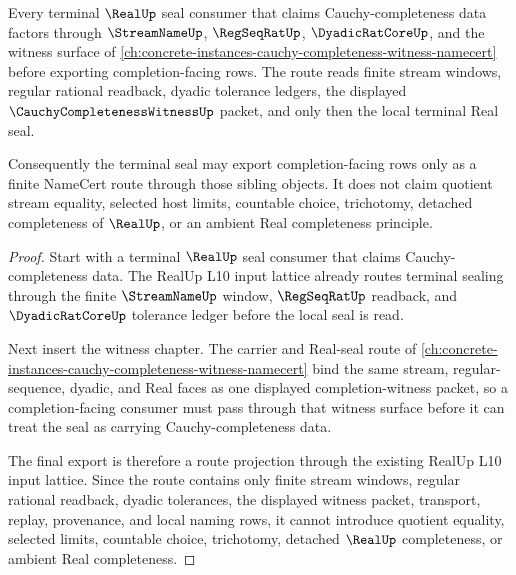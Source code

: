 \begin{theorem}
\label{thm:real-terminal-seal-cauchy-completeness-witness}
Every terminal $\RealUp$ seal consumer that claims Cauchy-completeness data factors through $\StreamNameUp$, $\RegSeqRatUp$, $\DyadicRatCoreUp$, and the witness surface of \autoref{ch:concrete-instances-cauchy-completeness-witness-namecert} before exporting completion-facing rows. The route reads finite stream windows, regular rational readback, dyadic tolerance ledgers, the displayed $\CauchyCompletenessWitnessUp$ packet, and only then the local terminal Real seal.

Consequently the terminal seal may export completion-facing rows only as a finite NameCert route through those sibling objects. It does not claim quotient stream equality, selected host limits, countable choice, trichotomy, detached completeness of $\RealUp$, or an ambient Real completeness principle.
\end{theorem}
\begin{proof}
Start with a terminal $\RealUp$ seal consumer that claims Cauchy-completeness data. The RealUp L10 input lattice already routes terminal sealing through the finite $\StreamNameUp$ window, $\RegSeqRatUp$ readback, and $\DyadicRatCoreUp$ tolerance ledger before the local seal is read.

Next insert the witness chapter. The carrier and Real-seal route of \autoref{ch:concrete-instances-cauchy-completeness-witness-namecert} bind the same stream, regular-sequence, dyadic, and Real faces as one displayed completion-witness packet, so a completion-facing consumer must pass through that witness surface before it can treat the seal as carrying Cauchy-completeness data.

The final export is therefore a route projection through the existing RealUp L10 input lattice. Since the route contains only finite stream windows, regular rational readback, dyadic tolerances, the displayed witness packet, transport, replay, provenance, and local naming rows, it cannot introduce quotient equality, selected limits, countable choice, trichotomy, detached $\RealUp$ completeness, or ambient Real completeness.
\end{proof}

